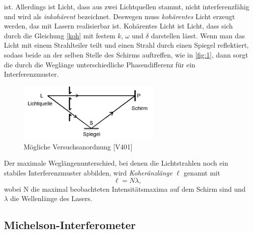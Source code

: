 ist. Allerdings ist Licht, dass aus zwei Lichtquellen stammt, nicht interferenzfähig und wird als \textit{inkohärent} bezeichnet. Deswegen muss \textit{kohärentes} Licht erzeugt werden, das mit Lasern realisierbar ist. Kohärentes Licht ist Licht, dass sich durch die Gleichung \eqref{koh} mit festem $k$, $\omega$ und $\delta$ darstellen lässt.
Wenn man das Licht mit einem Strahlteiler teilt und einen Strahl durch einen Spiegel reflektiert, sodass beide an der selben Stelle des Schirms auftreffen, wie in \autoref{fig:1}, dann sorgt die durch die Weglänge unterschiedliche Phasendifferenz für ein Interferenzmuster.
\begin{figure}[H]
  \centering
  \includegraphics[width=7cm]{1}
  \caption{Mögliche Versuchsanordnung [V401]}
  \label{fig:1}
\end{figure}
Der maximale Weglängenunterschied, bei denen die Lichtstrahlen noch ein stabiles Interferenzmuster abbilden, wird \textit{Koheränzlänge} $\ell$ genannt mit
\begin{equation}
  \ell=N\lambda, \nonumber
\end{equation}
wobei N die maximal beobachteten Intensitätsmaxima auf dem Schirm sind und $\lambda$ die Wellenlänge des Lasers.

\subsection{Michelson-Interferometer}

